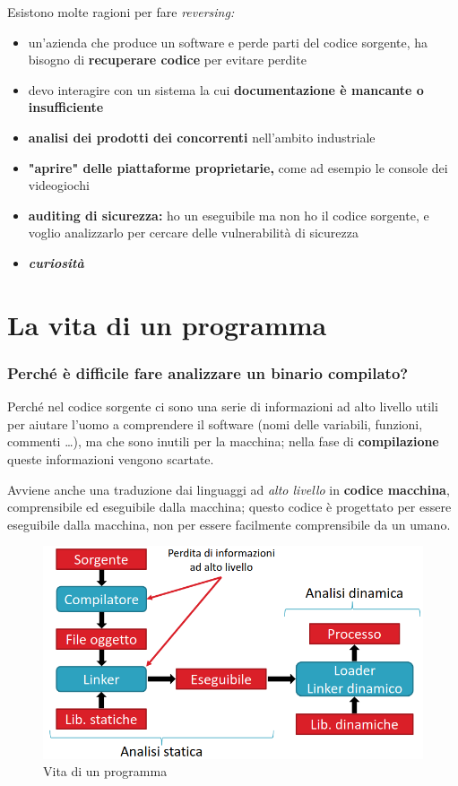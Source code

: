 Esistono molte ragioni per fare \textit{reversing:}
\begin{itemize}
    \item un'azienda che produce un software e perde parti del codice sorgente,
    ha bisogno di \textbf{recuperare codice} per evitare perdite
    \item devo interagire con un sistema la cui \textbf{documentazione è mancante o insufficiente}
    \item \textbf{analisi dei prodotti dei concorrenti} nell'ambito industriale
    \item \textbf{"aprire" delle piattaforme proprietarie,} come ad esempio le console dei videogiochi
    \item \textbf{auditing di sicurezza:} ho un eseguibile ma non ho il codice sorgente, e voglio 
    analizzarlo per cercare delle vulnerabilità di sicurezza
    \item \textbf{\textit{curiosità}}
\end{itemize}

\section{La vita di un programma}

\subsubsection{Perché è difficile fare analizzare un binario compilato?}

Perché nel codice sorgente ci sono una serie di informazioni ad alto livello utili
per aiutare l'uomo a comprendere il software (nomi delle variabili, funzioni, commenti \dots),
ma che sono inutili per la macchina; nella fase di \textbf{compilazione} queste informazioni
vengono scartate. 

Avviene anche una traduzione dai linguaggi ad \textit{alto livello} in \textbf{codice macchina},
comprensibile ed eseguibile dalla macchina; questo codice è progettato per essere eseguibile dalla macchina,
non per essere facilmente comprensibile da un umano.

\begin{figure}[ht]
    \centering
    \includegraphics[width=0.75\linewidth]{images/program-life.png}
    \caption{Vita di un programma}
\end{figure}

